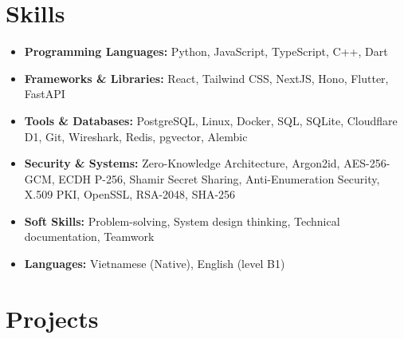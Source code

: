 \documentclass[10pt,a4paper]{article}
\begin{document}
\section*{Skills}
\begin{itemize}[leftmargin=0.15in, label={}, itemsep=0pt]
    \item \textbf{Programming Languages:} Python, JavaScript, TypeScript, C++, Dart
    \item \textbf{Frameworks \& Libraries:} React, Tailwind CSS, NextJS, Hono, Flutter, FastAPI
    \item \textbf{Tools \& Databases:} PostgreSQL, Linux, Docker, SQL, SQLite, Cloudflare D1, Git, Wireshark, Redis, pgvector, Alembic
    \item \textbf{Security \& Systems:} Zero-Knowledge Architecture, Argon2id, AES-256-GCM, ECDH P-256, Shamir Secret Sharing, Anti-Enumeration Security, X.509 PKI, OpenSSL, RSA-2048, SHA-256
    \item \textbf{Soft Skills:} Problem-solving, System design thinking, Technical documentation, Teamwork
    \item \textbf{Languages:} Vietnamese (Native), English (level B1)
\end{itemize}

\section*{Projects}
\end{document}
